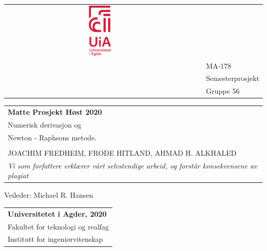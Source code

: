 \begin{titlepage}


\newcommand{\FagKode}{MA-178} %
\newcommand{\Tutorial}{Semesterprosjekt}    %
\newcommand{\gruppeNr}{56}                  %

\newcommand{\myTitle}{Matte Prosjekt Høst 2020}
\newcommand{\mySubtitle}{Numerisk derivasjon og\\ Newton - Raphsons metode.}

\newcommand{\myAuthor}{MERETHE FLÅT, TOBIAS BRAMBO, MAXIME R. CARA,\\ JOACHIM FREDHEIM, FRODE HITLAND, AHMAD H. ALKHALED}
\newcommand{\supervisor}{Veileder: Michael R. Hansen}
\newcommand{\aar}{2020}




\newcommand{\declaration}{Vi som forfattere erklærer vårt selvstendige arbeid, og forstår konsekvensene av plagiat}
\newcommand{\faculty}{teknologi og realfag}
\newcommand{\department}{ingeniørvitenskap}

\begin{tabular}{c | l l}
\multirow{1}{*}{\includegraphics[width = 0.12\textwidth]{Figures/logo.eps}} & &                     \\[1ex]
                                                                            & & \huge{\FagKode}     \\[2ex]
                                                                            & & \Large{\Tutorial}   \\[5ex]
                                                                            & &\large{Gruppe \gruppeNr}\\
\end{tabular}

\begin{tabular}{l}
                                        \\[2.5cm]
        {\LARGE\textbf{{\myTitle}}}     \\[1cm]
        \mySubtitle                     \\[2.5cm]
        {\Large{\myAuthor}}             \\[1cm]
         \small{\textit{\declaration}}  \\[6cm]
\end{tabular}
\LARGE{Veileder: Michael R. Hansen}
\vfill


\begin{tabular}{l }
\textbf{Universitetet i Agder, \aar}    \\
Fakultet for \faculty                   \\
Institutt for \department               \\
\end{tabular}
\end{titlepage}
